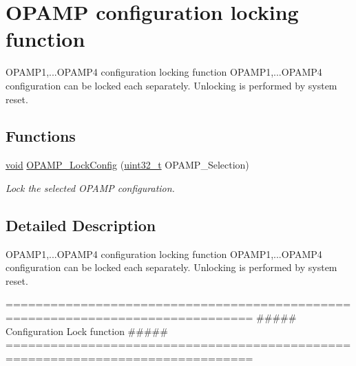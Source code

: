 \hypertarget{group___o_p_a_m_p___group2}{\section{O\-P\-A\-M\-P configuration locking function}
\label{group___o_p_a_m_p___group2}
}


O\-P\-A\-M\-P1,...O\-P\-A\-M\-P4 configuration locking function O\-P\-A\-M\-P1,...O\-P\-A\-M\-P4 configuration can be locked each separately. Unlocking is performed by system reset.  


\subsection*{Functions}
\begin{DoxyCompactItemize}
\item 
\hyperlink{group___n_a_m_e_ga18028b8badbf1ea7e704ccac3c488e82}{void} \hyperlink{group___o_p_a_m_p___group2_gabd6873598109d36b07146c1ad34079bc}{O\-P\-A\-M\-P\-\_\-\-Lock\-Config} (\hyperlink{stdint_8h_a435d1572bf3f880d55459d9805097f62}{uint32\-\_\-t} O\-P\-A\-M\-P\-\_\-\-Selection)
\begin{DoxyCompactList}\small\item\em Lock the selected O\-P\-A\-M\-P configuration. \end{DoxyCompactList}\end{DoxyCompactItemize}


\subsection{Detailed Description}
O\-P\-A\-M\-P1,...O\-P\-A\-M\-P4 configuration locking function O\-P\-A\-M\-P1,...O\-P\-A\-M\-P4 configuration can be locked each separately. Unlocking is performed by system reset. \begin{DoxyVerb} ===============================================================================
                     ##### Configuration Lock function #####
 ===============================================================================  \end{DoxyVerb}
 

